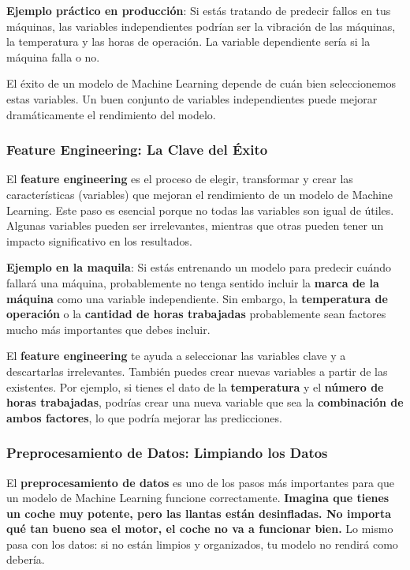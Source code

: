 \documentclass[
  10pt,
  letterpaper,
]{book}
\begin{document}
\textbf{Ejemplo práctico en producción}: Si estás tratando de predecir
fallos en tus máquinas, las variables independientes podrían ser la
vibración de las máquinas, la temperatura y las horas de operación. La
variable dependiente sería si la máquina falla o no.

El éxito de un modelo de Machine Learning depende de cuán bien
seleccionemos estas variables. Un buen conjunto de variables
independientes puede mejorar dramáticamente el rendimiento del modelo.

\subsubsection{\texorpdfstring{\textbf{Feature Engineering: La Clave del
Éxito}}{Feature Engineering: La Clave del Éxito}}\label{feature-engineering-la-clave-del-uxe9xito}

El \textbf{feature engineering} es el proceso de elegir, transformar y
crear las características (variables) que mejoran el rendimiento de un
modelo de Machine Learning. Este paso es esencial porque no todas las
variables son igual de útiles. Algunas variables pueden ser
irrelevantes, mientras que otras pueden tener un impacto significativo
en los resultados.

\textbf{Ejemplo en la maquila}: Si estás entrenando un modelo para
predecir cuándo fallará una máquina, probablemente no tenga sentido
incluir la \textbf{marca de la máquina} como una variable independiente.
Sin embargo, la \textbf{temperatura de operación} o la \textbf{cantidad
de horas trabajadas} probablemente sean factores mucho más importantes
que debes incluir.

El \textbf{feature engineering} te ayuda a seleccionar las variables
clave y a descartarlas irrelevantes. También puedes crear nuevas
variables a partir de las existentes. Por ejemplo, si tienes el dato de
la \textbf{temperatura} y el \textbf{número de horas trabajadas},
podrías crear una nueva variable que sea la \textbf{combinación de ambos
factores}, lo que podría mejorar las predicciones.

\subsubsection{\texorpdfstring{\textbf{Preprocesamiento de Datos:
Limpiando los
Datos}}{Preprocesamiento de Datos: Limpiando los Datos}}\label{preprocesamiento-de-datos-limpiando-los-datos}

El \textbf{preprocesamiento de datos} es uno de los pasos más
importantes para que un modelo de Machine Learning funcione
correctamente. \textbf{Imagina que tienes un coche muy potente, pero las
llantas están desinfladas. No importa qué tan bueno sea el motor, el
coche no va a funcionar bien.} Lo mismo pasa con los datos: si no están
limpios y organizados, tu modelo no rendirá como debería.
\end{document}
